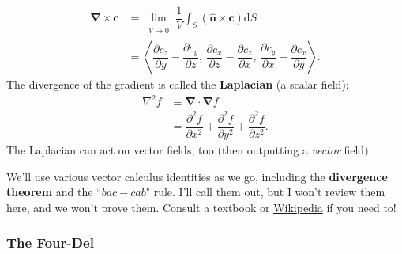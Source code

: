 \documentclass[12pt]{article}
\renewcommand{\vv}[1]{\mathbf{#1}}
\newcommand{\dd}[1]{\mathrm{d}#1}
\newcommand{\del}{\boldsymbol{\nabla}}
\begin{document}
\begin{equation*}
\begin{aligned}
\del \times \vv c &= \lim\limits_{\substack{\\ V \to 0}} \dfrac{1}{V} \int_S \left(\vv{\hat{n}} \times \vv c \right) \dd S \\[4pt]
&= \left \langle \dfrac{\partial c_z}{\partial y} - \dfrac{\partial c_y}{\partial z}, \, \dfrac{\partial c_x}{\partial z} - \dfrac{\partial c_z}{\partial x}, \, \dfrac{\partial c_y}{\partial x} - \dfrac{\partial c_x}{\partial y} \right \rangle .
\end{aligned}
\end{equation*}
The divergence of the gradient is called the \textbf{Laplacian} (a scalar field):
\begin{equation*}
\begin{aligned}
\nabla^2 f &\equiv \del \cdot \del f \\[2pt]
&= \dfrac{\partial^2 f}{\partial x^2} + \dfrac{\partial^2 f}{\partial y^2} + \dfrac{\partial^2 f}{\partial z^2}.
\end{aligned}
\end{equation*}
The Laplacian can act on vector fields, too (then outputting a \emph{vector} field).

We'll use various vector calculus identities as we go, including the \textbf{divergence theorem} and the ``$bac - cab$" rule. I'll call them out, but I won't review them here, and we won't prove them. Consult a textbook or \href{https://en.wikipedia.org/wiki/Vector_calculus_identities}{Wikipedia} if you need to!


\subsubsection{The Four-Del}\label{sssec:fd}
\end{document}
